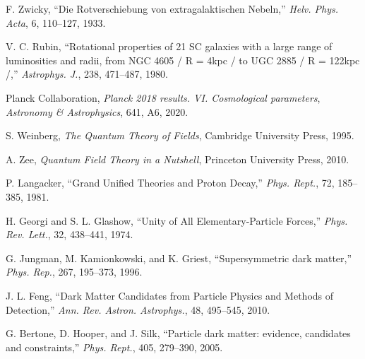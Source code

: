\documentclass[12pt]{article}
\begin{document}
\begin{thebibliography}{9}

F. Zwicky, 
``Die Rotverschiebung von extragalaktischen Nebeln,''
\textit{Helv. Phys. Acta}, 6, 110--127, 1933.

V. C. Rubin,
``Rotational properties of 21 SC galaxies with a large range of luminosities and radii, from NGC 4605 / R = 4kpc / to UGC 2885 / R = 122kpc /,''
\textit{Astrophys. J.}, 238, 471--487, 1980.

Planck Collaboration,
\textit{Planck 2018 results. VI. Cosmological parameters},
\textit{Astronomy \& Astrophysics}, 641, A6, 2020.

S. Weinberg,
\textit{The Quantum Theory of Fields},
Cambridge University Press, 1995.

A. Zee,
\textit{Quantum Field Theory in a Nutshell},
Princeton University Press, 2010.

P. Langacker,
``Grand Unified Theories and Proton Decay,''
\textit{Phys. Rept.}, 72, 185--385, 1981.

H. Georgi and S. L. Glashow,
``Unity of All Elementary-Particle Forces,''
\textit{Phys. Rev. Lett.}, 32, 438--441, 1974.

G. Jungman, M. Kamionkowski, and K. Griest,
``Supersymmetric dark matter,''
\textit{Phys. Rep.}, 267, 195--373, 1996.

J. L. Feng,
``Dark Matter Candidates from Particle Physics and Methods of Detection,''
\textit{Ann. Rev. Astron. Astrophys.}, 48, 495--545, 2010.

G. Bertone, D. Hooper, and J. Silk,
``Particle dark matter: evidence, candidates and constraints,''
\textit{Phys. Rept.}, 405, 279--390, 2005.

\end{thebibliography}
\end{document}
